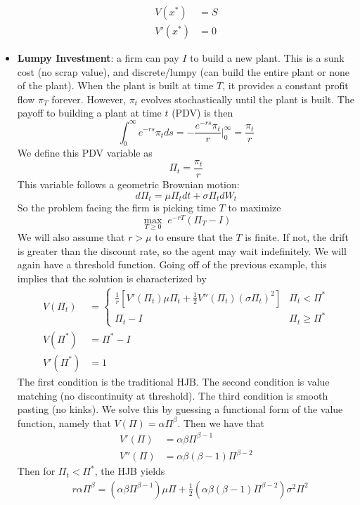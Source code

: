\documentclass[12pt]{article}
\begin{document}
\begin{itemize}
\[\begin{split}
        V(x^*) &= S \\
        V'(x^*) &= 0
    \end{split}\]
    \item \textbf{Lumpy Investment}: a firm can pay $I$ to build a new plant. This is a sunk cost (no scrap value), and discrete/lumpy (can build the entire plant or none of the plant). When the plant is built at time $T$, it provides a constant profit flow $\pi_T$ forever. However, $\pi_t$ evolves stochastically until the plant is built. The payoff to building a plant at time $t$ (PDV) is then
    \[\int_0^{\infty}e^{-rs}\pi_tds = -\frac{e^{-rs}\pi_t}{r}\bigg|_0^{\infty}= \frac{\pi_t}{r}\]
    We define this PDV variable as
    \[\Pi_t = \frac{\pi_t}{r}\]
    This variable follows a geometric Brownian motion:
    \[d\Pi_t = \mu \Pi_tdt + \sigma \Pi_tdW_t\]
    So the problem facing the firm is picking time $T$ to maximize
    \[\max_{T \geq 0}\; e^{-rT}\left(\Pi_T - I\right)\]
    We will also assume that $r > \mu$ to ensure that the $T$ is finite. If not, the drift is greater than the discount rate, so the agent may wait indefinitely. We will again have a threshold function. Going off of the previous example, this implies that the solution is characterized by
    \[\begin{split}
        V(\Pi_t) &= \begin{cases}
        \frac{1}{r}\left[V'(\Pi_t)\mu \Pi_t + \frac{1}{2}V''(\Pi_t)\left(\sigma\Pi_t\right)^2\right] & \Pi_t < \Pi^* \\
        \Pi_t - I & \Pi_t \geq \Pi^*
        \end{cases} \\ 
        V(\Pi^*) &= \Pi^* - I \\
        V'(\Pi^*) &= 1
    \end{split}\]
    The first condition is the traditional HJB. The second condition is value matching (no discontinuity at threshold). The third condition is smooth pasting (no kinks). We solve this by guessing a functional form of the value function, namely that $V(\Pi) = \alpha \Pi^{\beta}$. Then we have that
    \[\begin{split}
        V'(\Pi) &= \alpha\beta \Pi^{\beta - 1} \\
        V''(\Pi) &= \alpha\beta(\beta - 1)\Pi^{\beta - 2}
    \end{split}\]
    Then for $\Pi_t < \Pi^*$, the HJB yields
    \[\begin{split}
        &r\alpha \Pi^{\beta} =\left(\alpha\beta \Pi^{\beta - 1}\right)\mu\Pi + \frac{1}{2}\left(\alpha\beta(\beta - 1)\Pi^{\beta - 2}\right)\sigma^2\Pi^2 \\

\end{split}\]
\end{itemize}
\end{document}
